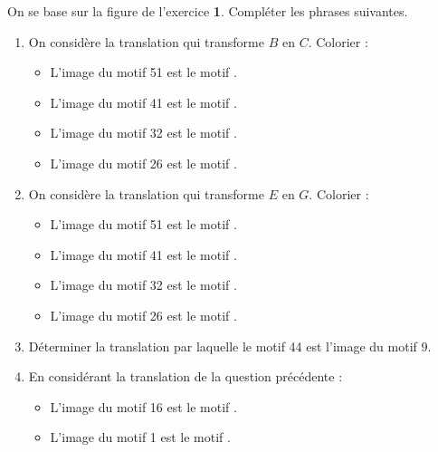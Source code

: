 \begin{exercice*}
    On se base sur la figure de l'exercice {\bfseries 1}. Compléter les phrases suivantes.
    \begin{enumerate}
        \item On considère la translation qui transforme $B$ en $C$. Colorier  :
        \begin{itemize}
            \item L'image du motif \num{51} est le motif \dotfill.
            \item L'image du motif \num{41} est le motif \dotfill.
            \item L'image du motif \num{32} est le motif \dotfill.
            \item L'image du motif \num{26} est le motif \dotfill.
        \end{itemize}
        \item On considère la translation qui transforme $E$ en $G$. Colorier  :
        \begin{itemize}
            \item L'image du motif \num{51} est le motif \dotfill.
            \item L'image du motif \num{41} est le motif \dotfill.
            \item L'image du motif \num{32} est le motif \dotfill.
            \item L'image du motif \num{26} est le motif \dotfill.
        \end{itemize}
        \item Déterminer la translation par laquelle le motif \num{44} est l'image du motif \num{9}.
        \item En considérant la translation de la question précédente :
        \begin{itemize}
            \item L'image du motif \num{16} est le motif \dotfill.
            \item L'image du motif \num{1} est le motif \dotfill.
        \end{itemize}
    \end{enumerate}
\end{exercice*}
